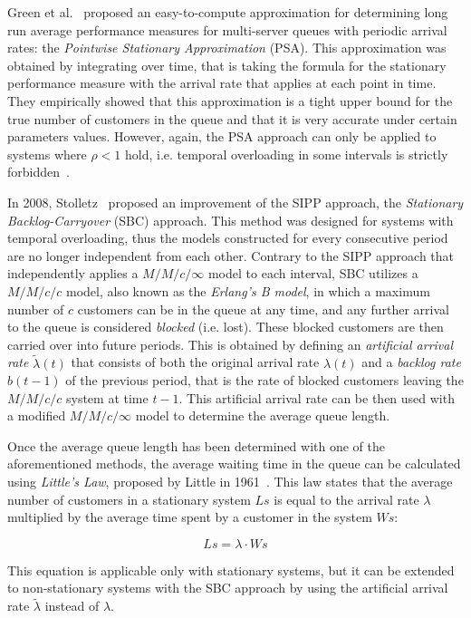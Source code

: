Green et al.~\cite{green1991} proposed an easy-to-compute approximation for determining long run average performance measures for multi-server queues with periodic arrival rates: the \emph{Pointwise Stationary Approximation} (PSA). This approximation was obtained by integrating over time, that is taking the formula for the stationary performance measure with the arrival rate that applies at each point in time. They empirically showed that this approximation is a tight upper bound for the true number of customers in the queue and that it is very accurate under certain parameters values. However, again, the PSA approach can only be applied to systems where \( \rho < 1 \) hold, i.e. temporal overloading in some intervals is strictly forbidden~\cite{stolletz}.

In 2008, Stolletz~\cite{stolletz} proposed an improvement of the SIPP approach, the \emph{Stationary Backlog-Carryover} (SBC) approach. This method was designed for systems with temporal overloading, thus the models constructed for every consecutive period are no longer independent from each other. Contrary to the SIPP approach that independently applies a \( M/M/c/\infty \) model to each interval, SBC utilizes a \( M/M/c/c \) model, also known as the \emph{Erlang’s B model}, in which a maximum number of \( c \) customers can be in the queue at any time, and any further arrival to the queue is considered \emph{blocked} (i.e. lost). These blocked customers are then carried over into future periods. This is obtained by defining an \emph{artificial arrival rate} \( \widetilde{\lambda}(t) \) that consists of both the original arrival rate \( \lambda(t) \) and a \emph{backlog rate} \( b(t-1) \) of the previous period, that is the rate of blocked customers leaving the \( M/M/c/c \) system at time \( t-1 \). This artificial arrival rate can be then used with a modified \( M/M/c/\infty \) model to determine the average queue length.

Once the average queue length has been determined with one of the aforementioned methods, the average waiting time in the queue can be calculated using \emph{Little’s Law}, proposed by Little in 1961~\cite{little}. This law states that the average number of customers in a stationary system \( Ls \) is equal to the arrival rate \( \lambda \) multiplied by the average time spent by a customer in the system \( Ws \):

\begin{equation}
  Ls = \lambda \cdot Ws
  \label{eq:little_law}
\end{equation}

This equation is applicable only with stationary systems, but it can be extended to non-stationary systems with the SBC approach by using the artificial arrival rate \( \widetilde{\lambda} \) instead of \( \lambda \).

\clearpage
